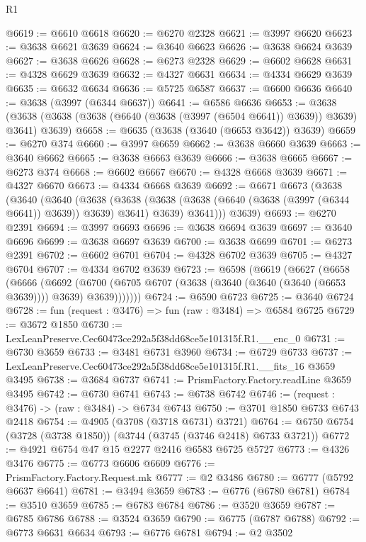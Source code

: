 \begin{lexlean}{R1}
\begin{coremodule}
@6619 := @6610 @6618
@6620 := @6270 @2328
@6621 := @3997 @6620
@6623 := @3638 @6621 @3639
@6624 := @3640 @6623
@6626 := @3638 @6624 @3639
@6627 := @3638 @6626
@6628 := @6273 @2328
@6629 := @6602 @6628
@6631 := @4328 @6629 @3639
@6632 := @4327 @6631
@6634 := @4334 @6629 @3639
@6635 := @6632 @6634
@6636 := @5725 @6587
@6637 := @6600 @6636
@6640 := @3638 (@3997 (@6344 @6637))
@6641 := @6586 @6636
@6653 := @3638 (@3638 (@3638 (@3638 (@6640 (@3638 (@3997 (@6504 @6641)) @3639)) @3639) @3641) @3639)
@6658 := @6635 (@3638 (@3640 (@6653 @3642)) @3639)
@6659 := @6270 @374
@6660 := @3997 @6659
@6662 := @3638 @6660 @3639
@6663 := @3640 @6662
@6665 := @3638 @6663 @3639
@6666 := @3638 @6665
@6667 := @6273 @374
@6668 := @6602 @6667
@6670 := @4328 @6668 @3639
@6671 := @4327 @6670
@6673 := @4334 @6668 @3639
@6692 := @6671
    @6673
    (@3638
      (@3640
        (@3640
          (@3638
            (@3638 (@3638 (@3638 (@6640 (@3638 (@3997 (@6344 @6641)) @3639)) @3639) @3641) @3639)
            @3641)))
      @3639)
@6693 := @6270 @2391
@6694 := @3997 @6693
@6696 := @3638 @6694 @3639
@6697 := @3640 @6696
@6699 := @3638 @6697 @3639
@6700 := @3638 @6699
@6701 := @6273 @2391
@6702 := @6602 @6701
@6704 := @4328 @6702 @3639
@6705 := @4327 @6704
@6707 := @4334 @6702 @3639
@6723 := @6598
    (@6619
      (@6627
        (@6658
          (@6666
            (@6692
              (@6700 (@6705 @6707 (@3638 (@3640 (@3640 (@3640 (@6653 @3639)))) @3639) @3639)))))))
@6724 := @6590 @6723
@6725 := @3640 @6724
@6728 := fun (request : @3476) => fun (raw : @3484) => @6584 @6725
@6729 := @3672 @1850
@6730 := LexLeanPreserve.Cec60473ce292a5f38dd68ce5e101315f.R1.__enc_0
@6731 := @6730 @3659
@6733 := @3481 @6731 @3960
@6734 := @6729 @6733
@6737 := LexLeanPreserve.Cec60473ce292a5f38dd68ce5e101315f.R1.__fits_16 @3659 @3495
@6738 := @3684 @6737
@6741 := PrismFactory.Factory.readLine @3659 @3495
@6742 := @6730 @6741
@6743 := @6738 @6742
@6746 := (request : @3476) -> (raw : @3484) -> @6734 @6743
@6750 := @3701 @1850 @6733 @6743 @2418
@6754 := @4905 (@3708 (@3718 @6731) @3721)
@6764 := @6750 @6754 (@3728 (@3738 @1850)) (@3744 (@3745 (@3746 @2418) @6733 @3721))
@6772 := @4921 @6754 @47 @15 @2277 @2416 @6583 @6725 @5727
@6773 := @4326 @3476
@6775 := @6773 @6606 @6609
@6776 := PrismFactory.Factory.Request.mk
@6777 := @2 @3486
@6780 := @6777 (@5792 @6637 @6641)
@6781 := @3494 @3659
@6783 := @6776 (@6780 @6781)
@6784 := @3510 @3659
@6785 := @6783 @6784
@6786 := @3520 @3659
@6787 := @6785 @6786
@6788 := @3524 @3659
@6790 := @6775 (@6787 @6788)
@6792 := @6773 @6631 @6634
@6793 := @6776 @6781
@6794 := @2 @3502

\end{coremodule}
\end{lexlean}
